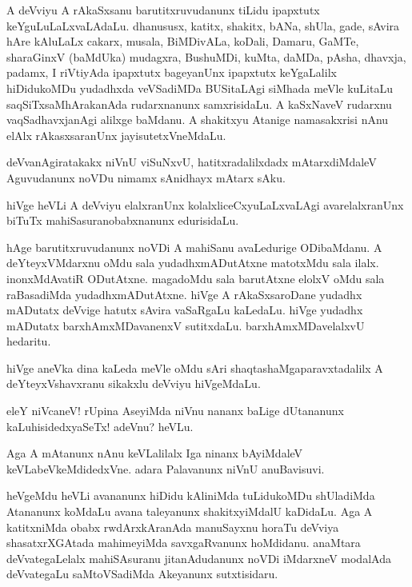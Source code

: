 \begin{mng}
A deVviyu A rAkaSxsanu barutitxruvudanunx tiLidu ipapxtutx keYguLuLaLxvaLAdaLu. dhanususx, katitx, shakitx, bANa, shUla, gade, sAvira hAre kAluLaLx cakarx, musala, BiMDivALa, koDali, Damaru, GaMTe, sharaGinxV (baMdUka) mudagxra, BushuMDi, kuMta, daMDa, pAsha, dhavxja, padamx, I riVtiyAda ipapxtutx bageyanUnx ipapxtutx keYgaLalilx hiDidukoMDu yudadhxda veVSadiMDa BUSitaLAgi siMhada meVle kuLitaLu saqSiTxsaMhArakanAda rudarxnanunx samxrisidaLu. A kaSxNaveV rudarxnu vaqSadhavxjanAgi alilxge baMdanu. A shakitxyu Atanige namasakxrisi nAnu elAlx rAkasxsaranUnx jayisutetxVneMdaLu.
\end{mng}

\begin{mng}
deVvanAgiratakakx niVnU viSuNxvU, hatitxradalilxdadx mAtarxdiMdaleV Aguvudanunx noVDu nimamx sAnidhayx mAtarx sAku.
\end{mng}

\begin{mng}
hiVge heVLi A deVviyu elalxranUnx kolalxliceCxyuLaLxvaLAgi avarelalxranUnx biTuTx mahiSasuranobabxnanunx edurisidaLu.
\end{mng}

\begin{mng}
hAge barutitxruvudanunx noVDi A mahiSanu avaLedurige ODibaMdanu. A deYteyxVMdarxnu oMdu sala yudadhxmADutAtxne matotxMdu sala ilalx. inonxMdAvatiR ODutAtxne. magadoMdu sala barutAtxne elolxV oMdu sala raBasadiMda yudadhxmADutAtxne. hiVge A rAkaSxsaroDane yudadhx mADutatx deVvige hatutx sAvira vaSaRgaLu kaLedaLu. hiVge yudadhx mADutatx barxhAmxMDavanenxV sutitxdaLu. barxhAmxMDavelalxvU hedaritu.
\end{mng}

\begin{mng}
hiVge aneVka dina kaLeda meVle oMdu sAri shaqtashaMgaparavxtadalilx A deYteyxVshavxranu sikakxlu deVviyu hiVgeMdaLu.
\end{mng}

\begin{mng}
eleY niVcaneV! rUpina AseyiMda niVnu nananx baLige dUtananunx kaLuhisidedxyaSeTx! adeVnu? heVLu.
\end{mng}

\begin{mng}
Aga A mAtanunx nAnu keVLalilalx Iga ninanx bAyiMdaleV keVLabeVkeMdidedxVne. adara Palavanunx niVnU anuBavisuvi.
\end{mng}

\begin{mng}
heVgeMdu heVLi avananunx hiDidu kAliniMda tuLidukoMDu shUladiMda Atananunx koMdaLu avana taleyanunx shakitxyiMdalU kaDidaLu. Aga A katitxniMda obabx rwdArxkAranAda manuSayxnu horaTu deVviya shasatxrXGAtada mahimeyiMda savxgaRvanunx hoMdidanu. anaMtara deVvategaLelalx mahiSAsuranu jitanAdudanunx noVDi iMdarxneV modalAda deVvategaLu saMtoVSadiMda Akeyanunx sutxtisidaru.
\end{mng}

